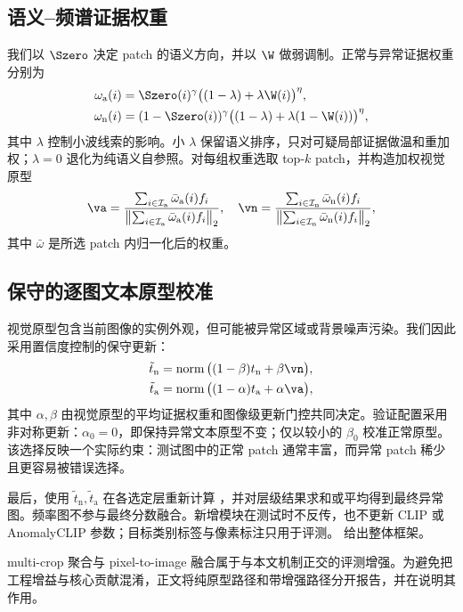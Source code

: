\subsection{语义--频谱证据权重}
我们以 $\Szero$ 决定 patch 的语义方向，并以 $\W$ 做弱调制。正常与异常证据权重分别为
\begin{align}
\omega_{\mathrm a}(i)
&=\Szero(i)^\gamma
\big((1-\lambda)+\lambda \W(i)\big)^\eta, \label{eq:wa}\\
\omega_{\mathrm n}(i)
&=(1-\Szero(i))^\gamma
\big((1-\lambda)+\lambda(1-\W(i))\big)^\eta, \label{eq:wn}
\end{align}
其中 $\lambda$ 控制小波线索的影响。小 $\lambda$ 保留语义排序，只对可疑局部证据做温和重加权；$\lambda=0$ 退化为纯语义自参照。对每组权重选取 top-$k$ patch，并构造加权视觉原型
\begin{equation}
\va=\frac{\sum_{i\in\mathcal I_{\mathrm a}}\bar\omega_{\mathrm a}(i)f_i}
{\left\|\sum_{i\in\mathcal I_{\mathrm a}}\bar\omega_{\mathrm a}(i)f_i\right\|_2},
\quad
\vn=\frac{\sum_{i\in\mathcal I_{\mathrm n}}\bar\omega_{\mathrm n}(i)f_i}
{\left\|\sum_{i\in\mathcal I_{\mathrm n}}\bar\omega_{\mathrm n}(i)f_i\right\|_2},
\label{eq:vproto}
\end{equation}
其中 $\bar\omega$ 是所选 patch 内归一化后的权重。

\subsection{保守的逐图文本原型校准}
视觉原型包含当前图像的实例外观，但可能被异常区域或背景噪声污染。我们因此采用置信度控制的保守更新：
\begin{align}
\tilde t_{\mathrm n}
&=\operatorname{norm}\big((1-\beta)t_{\mathrm n}+\beta \vn\big),\\
\tilde t_{\mathrm a}
&=\operatorname{norm}\big((1-\alpha)t_{\mathrm a}+\alpha \va\big),
\label{eq:update}
\end{align}
其中 $\alpha,\beta$ 由视觉原型的平均证据权重和图像级更新门控共同决定。验证配置采用非对称更新：$\alpha_0=0$，即保持异常文本原型不变；仅以较小的 $\beta_0$ 校准正常原型。该选择反映一个实际约束：测试图中的正常 patch 通常丰富，而异常 patch 稀少且更容易被错误选择。

最后，使用 $\tilde t_{\mathrm n},\tilde t_{\mathrm a}$ 在各选定层重新计算 ，并对层级结果求和或平均得到最终异常图。频率图不参与最终分数融合。新增模块在测试时不反传，也不更新 CLIP 或 AnomalyCLIP 参数；目标类别标签与像素标注只用于评测。 给出整体框架。



multi-crop 聚合与 pixel-to-image 融合属于与本文机制正交的评测增强。为避免把工程增益与核心贡献混淆，正文将纯原型路径和带增强路径分开报告，并在说明其作用。
